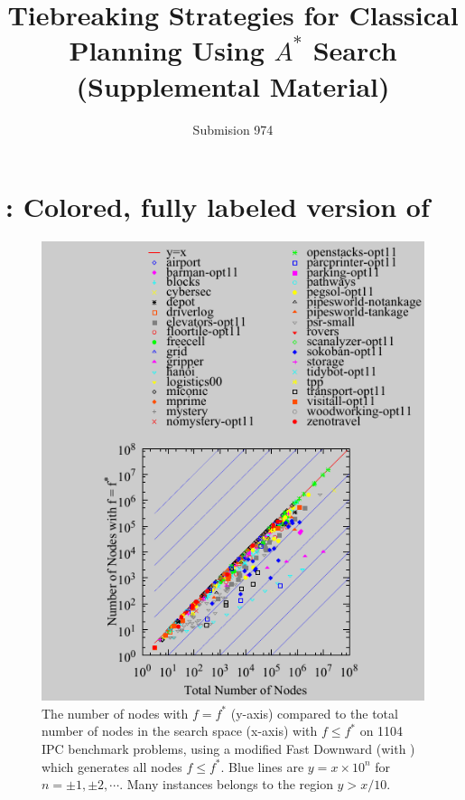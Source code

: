 \documentclass[10pt,letterpaper]{article}
\author{Submision 974}
\title{Tiebreaking Strategies for Classical Planning Using $A^*$ Search\\ (Supplemental Material)}
\begin{document}
\maketitle

\section{: Colored, fully labeled version of }

\begin{figure}[hb]
 \includegraphics{tables/aaai16-frontier/aaai16prelim3/lmcut_frontier_noh-front.pdf}
 \caption{
 The number of nodes with $f=f^*$ (y-axis) compared to the
 total number of nodes in the search space (x-axis) with $f\leq f^*$
 on 1104 IPC benchmark problems,
 using a modified Fast Downward (with \lmcut) which 
 generates all nodes $f\leq f^*$.
 Blue lines are $y=x \times 10^n$ for $n=\pm1,\pm2,\cdots$.
 Many instances belongs to the region $y>x/10$.
 }
 \label{plateau-noh-full}
\end{figure}

\newpage
\end{document}
